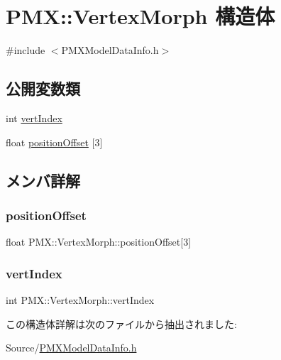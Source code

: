 \hypertarget{struct_p_m_x_1_1_vertex_morph}{}\section{P\+MX\+:\+:Vertex\+Morph 構造体}
\label{struct_p_m_x_1_1_vertex_morph}


{\ttfamily \#include $<$P\+M\+X\+Model\+Data\+Info.\+h$>$}

\subsection*{公開変数類}
\begin{DoxyCompactItemize}
\item 
int \mbox{\hyperlink{struct_p_m_x_1_1_vertex_morph_ac9ecb0700283894ee79cde747d9d25b2}{vert\+Index}}
\item 
float \mbox{\hyperlink{struct_p_m_x_1_1_vertex_morph_a287ac904d1caee9e2ddabaa68d5160d0}{position\+Offset}} \mbox{[}3\mbox{]}
\end{DoxyCompactItemize}


\subsection{メンバ詳解}
\mbox{\label{struct_p_m_x_1_1_vertex_morph_a287ac904d1caee9e2ddabaa68d5160d0}} 
\subsubsection{\texorpdfstring{position\+Offset}{positionOffset}}
{\footnotesize\ttfamily float P\+M\+X\+::\+Vertex\+Morph\+::position\+Offset\mbox{[}3\mbox{]}}

\mbox{\label{struct_p_m_x_1_1_vertex_morph_ac9ecb0700283894ee79cde747d9d25b2}} 
\subsubsection{\texorpdfstring{vert\+Index}{vertIndex}}
{\footnotesize\ttfamily int P\+M\+X\+::\+Vertex\+Morph\+::vert\+Index}



この構造体詳解は次のファイルから抽出されました\+:\begin{DoxyCompactItemize}
\item 
Source/\mbox{\hyperlink{_p_m_x_model_data_info_8h}{P\+M\+X\+Model\+Data\+Info.\+h}}\end{DoxyCompactItemize}
